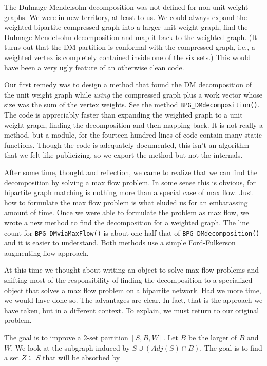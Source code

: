 The Dulmage-Mendelsohn decomposition was not defined for non-unit
weight graphs.
We were in new territory, at least to us.
We could always expand the weighted bipartite compressed graph into
a larger unit weight graph, find the Dulmage-Mendelsohn
decomposition and map it back to the weighted graph.
(It turns out that the DM partition is conformal with the
compressed graph, i.e., a weighted vertex is completely contained
inside one of the six sets.)
This would have been a very ugly feature of an otherwise clean code.
\par
Our first remedy was to design a method that found the DM
decomposition of the unit weight graph while {\it using} the
compressed graph plus a work vector whose size was the sum of the
vertex weights.
See the method {\tt BPG\_DMdecomposition()}.
The code is appreciably faster than expanding the weighted graph to
a unit weight graph, finding the decomposition and then mapping back.
It is not really a method, but a module, for the fourteen hundred
lines of code contain many static functions.
Though the code is adequately documented, this isn't an algorithm
that we felt like publicizing, so we export the method but not the
internals.
\par
After some time, thought and reflection, we came to realize that we
can find the decomposition by solving a max flow problem.
In some sense this is obvious, for bipartite graph matching is
nothing more than a special case of max flow.
Just how to formulate the max flow problem is what eluded us for an
embarassing amount of time.
Once we were able to formulate the problem as max flow, we wrote a
new method to find the decomposition for a weighted graph.
The line count for {\tt BPG\_DMviaMaxFlow()} is about one half that 
of {\tt BPG\_DMdecomposition()} and it is easier to understand.
Both methods use a simple Ford-Fulkerson augmenting flow approach.
\par
At this time we thought about writing an object to solve max flow
problems and shifting most of the responsibility of finding the
decomposition to a specialized object that solves a max flow
problem on a bipartite network.
Had we more time, we would have done so.
The advantages are clear.
In fact, that is the approach we have taken, but in a different
context.
To explain, we must return to our original problem.
\par
The goal is to improve a 2-set partition $[S,B,W]$.
Let $B$ be the larger of $B$ and $W$.
We look at the subgraph induced by $S \cup (Adj(S) \cap B)$.
The goal is to find a set $Z \subseteq S$ that will be absorbed by
